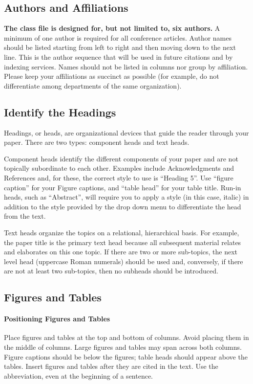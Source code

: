 \documentclass[conference]{IEEEtran}
\begin{document}
\subsection{Authors and Affiliations}
\textbf{The class file is designed for, but not limited to, six authors.} A 
minimum of one author is required for all conference articles. Author names 
should be listed starting from left to right and then moving down to the 
next line. This is the author sequence that will be used in future citations 
and by indexing services. Names should not be listed in columns nor group by 
affiliation. Please keep your affiliations as succinct as possible (for 
example, do not differentiate among departments of the same organization).

\subsection{Identify the Headings}
Headings, or heads, are organizational devices that guide the reader through 
your paper. There are two types: component heads and text heads.

Component heads identify the different components of your paper and are not 
topically subordinate to each other. Examples include Acknowledgments and 
References and, for these, the correct style to use is ``Heading 5''. Use 
``figure caption'' for your Figure captions, and ``table head'' for your 
table title. Run-in heads, such as ``Abstract'', will require you to apply a 
style (in this case, italic) in addition to the style provided by the drop 
down menu to differentiate the head from the text.

Text heads organize the topics on a relational, hierarchical basis. For 
example, the paper title is the primary text head because all subsequent 
material relates and elaborates on this one topic. If there are two or more 
sub-topics, the next level head (uppercase Roman numerals) should be used 
and, conversely, if there are not at least two sub-topics, then no subheads 
should be introduced.

\subsection{Figures and Tables}
\paragraph{Positioning Figures and Tables} Place figures and tables at the top and 
bottom of columns. Avoid placing them in the middle of columns. Large 
figures and tables may span across both columns. Figure captions should be 
below the figures; table heads should appear above the tables. Insert 
figures and tables after they are cited in the text. Use the abbreviation,
even at the beginning of a sentence.
\end{document}
